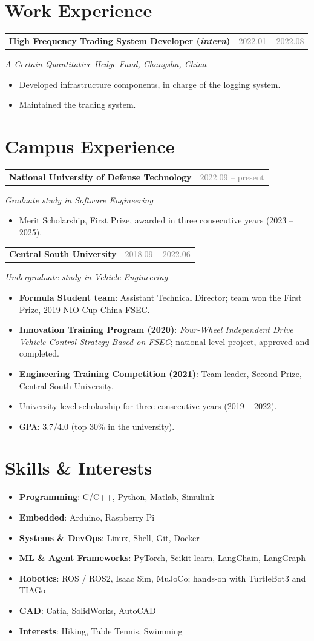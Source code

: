 \documentclass[10pt]{article}
\makeatletter
\newcommand{\entry}[3]{%
  \noindent\begin{tabular*}{\textwidth}{@{}l@{\extracolsep{\fill}}r@{}}
    \textbf{#1} & \textcolor{graytext}{#2}
  \end{tabular*}\par\vspace{-0.25em}
  \noindent\textit{#3}\par\vspace{0.22em}
}
\newcommand{\skill}[2]{\textbf{#1}: #2}
\makeatother
\begin{document}
\section{Work Experience}
\entry{High Frequency Trading System Developer (\textit{intern})}{2022.01 -- 2022.08}{A Certain Quantitative Hedge Fund, Changsha, China}
\begin{itemize}
\item Developed infrastructure components, in charge of the logging system.
\item Maintained the trading system.
\end{itemize}

\section{Campus Experience}
\entry{National University of Defense Technology}{2022.09 -- present}{Graduate study in Software Engineering}
\begin{itemize}
\item Merit Scholarship, First Prize, awarded in three consecutive years (2023 -- 2025).
\end{itemize}

\vspace{0.25em}
\entry{Central South University}{2018.09 -- 2022.06}{Undergraduate study in Vehicle Engineering}
\begin{itemize}
\item \textbf{Formula Student team}: Assistant Technical Director; team won the First Prize, 2019 NIO Cup China FSEC.
\item \textbf{Innovation Training Program (2020)}: \textit{Four-Wheel Independent Drive Vehicle Control Strategy Based on FSEC}; national-level project, approved and completed.
\item \textbf{Engineering Training Competition (2021)}: Team leader, Second Prize, Central South University.
\item University-level scholarship for three consecutive years (2019 -- 2022).
\item GPA: 3.7/4.0 (top 30\% in the university).
\end{itemize}

\enlargethispage{2\baselineskip}
\section{Skills \& Interests}
\begin{itemize}[itemsep=0pt,topsep=0.05em,parsep=0pt]
\item \skill{Programming}{C/C++, Python, Matlab, Simulink}
\item \skill{Embedded}{Arduino, Raspberry Pi}
\item \skill{Systems \& DevOps}{Linux, Shell, Git, Docker}
\item \skill{ML \& Agent Frameworks}{PyTorch, Scikit-learn, LangChain, LangGraph}
\item \skill{Robotics}{ROS / ROS2, Isaac Sim, MuJoCo; hands-on with TurtleBot3 and TIAGo}
\item \skill{CAD}{Catia, SolidWorks, AutoCAD}
\item \skill{Interests}{Hiking, Table Tennis, Swimming}
\end{itemize}
\end{document}
